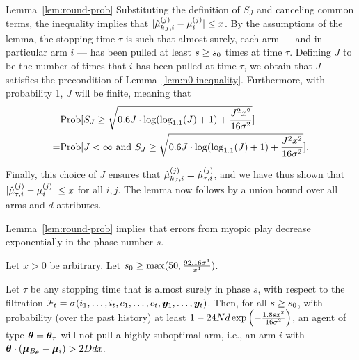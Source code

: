 \begin{extraproof}{Lemma~\ref{lem:round-prob}}
Substituting the definition of $S_J$ and canceling common terms,
the inequality implies that
$|\hat{\mu}_{k_J,i}^{(j)} - \mu_{i}^{(j)}| \leq x$.
By the assumptions of the lemma,
the stopping time $\tau$ is such that almost surely, each arm --- and
in particular arm $i$ --- has been pulled at least
$s \geq s_0$ times at time $\tau$.
Defining $J$ to be the number of times that $i$ has been pulled at
time $\tau$, we obtain that $J$ satisfies the precondition of
Lemma~\ref{lem:n0-inequality}.
Furthermore, with probability 1, $J$ will be finite, meaning that
\begin{align*}
& \Prob{S_J \geq 
\sqrt{0.6 J \cdot \log (\log_{1.1}(J) + 1) + \frac{J^2 x^2}{16
    \sigma^2}}}\\
= & \Prob{J < \infty \mbox{ and } S_J \geq 
\sqrt{0.6 J \cdot \log (\log_{1.1}(J) + 1) + \frac{J^2 x^2}{16
    \sigma^2}}}.
\end{align*}

Finally, this choice of $J$ ensures that
$\hat{\mu}_{k_J,i}^{(j)} = \hat{\mu}_{\tau,i}^{(j)}$,
and we have thus shown that
$|\hat{\mu}_{\tau,i}^{(j)} - \mu_{i}^{(j)}| \leq x$ for all $i,j$.
The lemma now follows by a union bound over all \ARMNUM arms and $d$
attributes.
\end{extraproof}


Lemma~\ref{lem:round-prob} implies that errors from myopic play
decrease exponentially in the phase number $s$.

\begin{corollary} \label{cor:right-choice}
Let $x > 0$ be arbitrary.
Let $s_0 \geq \max (50, \frac{92.16 \sigma^4}{x^4})$.

Let $\tau$ be any stopping time that is almost surely  in phase $s$,
with respect to the filtration
$\mathcal{F}_{t} = \sigma (i_{1}, \ldots, i_{t},
                          c_{1}, \ldots, c_{t},
                          \bm{y}_{1}, \ldots, \bm{y}_{t})$.
Then, for all $s \geq s_0$,
with probability (over the past history) at least 
$1 - 24 N d \exp\left(-\frac{1.8 s x^2}{16 \sigma^2} \right)$,
an agent of type $\bm{\theta} = \bm{\theta}_{\tau}$ 
will not pull a highly suboptimal arm, i.e., an arm $i$ with 
$\bm{\theta} \cdot (\bm{\mu}_{B_{\bm{\theta}}} - \bm{\mu}_{i}) > 2D d x$.
\end{corollary}

